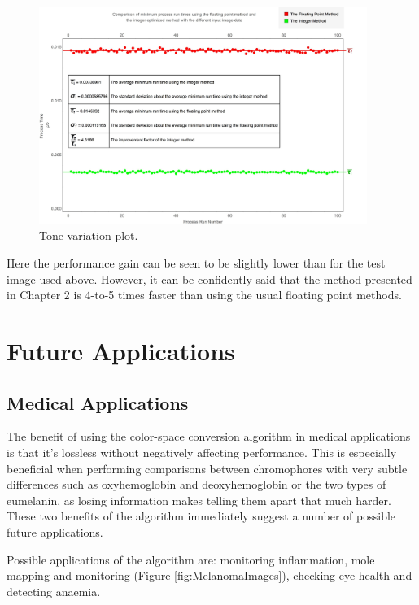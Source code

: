 \begin{figure}[h!]
  \centering
    \includegraphics[width=0.95\textwidth]{Chapter5/Figs/Tone_Variation_Plot.jpg}
    \caption{Tone variation plot.}\label{fig:ToneVariationPlot}
\end{figure}

Here the performance gain can be seen to be slightly lower than for the test image used above. However, it can be confidently said that the method presented in Chapter 2 is 4-to-5 times faster than using the usual floating point methods.

\section{Future Applications}\label{sec:FutureApplications}


\subsection{Medical Applications}\label{sec:MedicalApplications}

The benefit of using the color-space conversion algorithm in medical applications is that it's lossless without negatively affecting performance. This is especially beneficial when performing comparisons between chromophores with very subtle differences such as oxyhemoglobin and deoxyhemoglobin or the two types of eumelanin, as losing information makes telling them apart that much harder. These two benefits of the algorithm immediately suggest a number of possible future applications.

Possible applications of the algorithm are: monitoring inflammation, mole mapping and monitoring (Figure \ref{fig:MelanomaImages}), checking eye health and detecting anaemia.

